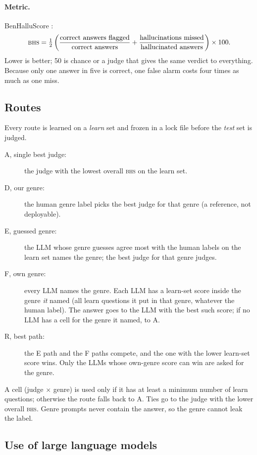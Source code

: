 \documentclass[pdflatex,sn-apa]{sn-jnl}
\newcommand{\BHS}{\textsc{bhs}}
\begin{document}
\paragraph{Metric.} BenHalluScore \citep{benhallueval}:
\begin{equation}
\BHS = \tfrac{1}{2}\left(\frac{\text{correct answers flagged}}{\text{correct answers}} +
\frac{\text{hallucinations missed}}{\text{hallucinated answers}}\right)\times 100 .
\end{equation}
Lower is better; 50 is chance or a judge that gives the same verdict to everything. Because only one answer in five is
correct, one false alarm costs four times as much as one miss.

\subsection{Routes}

Every route is learned on a \emph{learn} set and frozen in a lock file before the \emph{test} set is judged.
\begin{description}
  \item[A, single best judge:] the judge with the lowest overall \BHS{} on the learn set.
  \item[D, our genre:] the human genre label picks the best judge for that genre (a reference, not deployable).
  \item[E, guessed genre:] the LLM whose genre guesses agree most with the human labels on the learn set names the
  genre; the best judge for that genre judges.
  \item[F, own genre:] every LLM names the genre. Each LLM has a learn-set score inside the genre \emph{it} named
  (all learn questions it put in that genre, whatever the human label). The answer goes to the LLM with the best such
  score; if no LLM has a cell for the genre it named, to A.
  \item[R, best path:] the E path and the F paths compete, and the one with the lower learn-set score wins. Only the
  LLMs whose own-genre score can win are asked for the genre.
\end{description}
A cell (judge $\times$ genre) is used only if it has at least a minimum number of learn questions; otherwise the
route falls back to A. Ties go to the judge with the lower overall \BHS{}. Genre prompts never contain the answer, so
the genre cannot leak the label.

\subsection{Use of large language models}\label{sec:llmuse}
\end{document}
